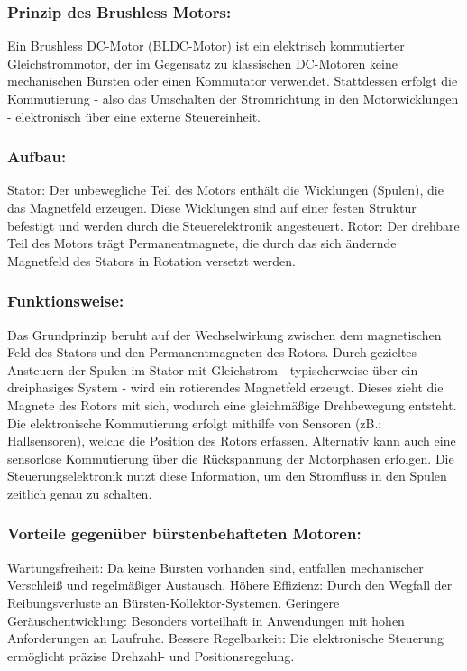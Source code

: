 \documentclass[a4paper,12pt]{article}
\begin{document}
            \subsubsection{Prinzip des Brushless Motors:}
            Ein Brushless DC-Motor (BLDC-Motor) ist ein elektrisch kommutierter Gleichstrommotor, der im Gegensatz zu klassischen DC-Motoren keine mechanischen Bürsten oder einen Kommutator verwendet. Stattdessen erfolgt die Kommutierung - also das Umschalten der Stromrichtung in den Motorwicklungen - elektronisch über eine externe Steuereinheit.

            \subsubsection{Aufbau:}
            Stator: Der unbewegliche Teil des Motors enthält die Wicklungen (Spulen), die das Magnetfeld erzeugen. Diese Wicklungen sind auf einer festen Struktur befestigt und werden durch die Steuerelektronik angesteuert.\newline
            Rotor:
            Der drehbare Teil des Motors trägt Permanentmagnete, die durch das sich ändernde Magnetfeld des Stators in Rotation versetzt werden.
            \subsubsection{Funktionsweise:}
            Das Grundprinzip beruht auf der Wechselwirkung zwischen dem magnetischen Feld des Stators und den Permanentmagneten des Rotors. Durch gezieltes Ansteuern der Spulen im Stator mit Gleichstrom - typischerweise über ein dreiphasiges System - wird ein rotierendes Magnetfeld erzeugt. Dieses zieht die Magnete des Rotors mit sich, wodurch eine gleichmäßige Drehbewegung entsteht.
            Die elektronische Kommutierung erfolgt mithilfe von Sensoren (zB.: Hallsensoren), welche die Position des Rotors erfassen. Alternativ kann auch eine sensorlose Kommutierung über die Rückspannung der Motorphasen erfolgen. Die Steuerungselektronik nutzt diese Information, um den Stromfluss in den Spulen zeitlich genau zu schalten.
            \subsubsection{Vorteile gegenüber bürstenbehafteten Motoren:}
            Wartungsfreiheit: Da keine Bürsten vorhanden sind, entfallen mechanischer Verschleiß und regelmäßiger Austausch.\newline
            Höhere Effizienz: Durch den Wegfall der Reibungsverluste an Bürsten-Kollektor-Systemen.\newline
            Geringere Geräuschentwicklung: Besonders vorteilhaft in Anwendungen mit hohen Anforderungen an Laufruhe.\newline
            Bessere Regelbarkeit: Die elektronische Steuerung ermöglicht präzise Drehzahl- und Positionsregelung.\newline
\end{document}
